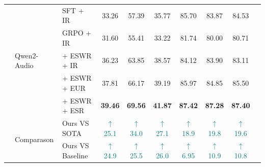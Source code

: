 \documentclass[11pt]{article}
\begin{document}
\begin{table}[ht]
\begin{tabularx}{\textwidth}{>{\raggedright\arraybackslash}p{1.55cm} llccccccc}
		\multirow{5}{*}{LALM-FT}
		                                     & \multirow{5}{*}{Qwen2-Audio~\cite{chu2024qwen2}}
		                                     & SFT + IR                                          & 33.26                            & 57.39                             & 35.77                                & 85.70                            & 83.87                            & 84.53                                                               \\
		                                     &                                                   & GRPO + IR                        & 31.60                             & 55.41                                & 33.22                            & 81.74                            & 80.00                            & 80.71                            \\
		                                     &                                                   & + ESWR + IR                      & 36.23                             & 63.85                                & 38.57                            & 84.12                            & 83.90                            & 83.11                            \\
		                                     &                                                   & + ESWR + EUR                     & 37.81                             & 66.17                                & 39.19                            & 85.97                            & 84.85                            & 85.50                            \\
		                                     &                                                   & + ESWR + ESR                     & \textbf{39.46}                    & \textbf{69.56}                       & \textbf{41.87}                   & \textbf{87.42}                   & \textbf{87.28}                   & \textbf{87.40}                   \\
		\midrule
		\multirow{2}{2}{/}                   & \multirow{2}{*}{Comparason}
		                                     & Ours VS SOTA                                      & \textcolor{teal}{$\uparrow$25.1} & \textcolor{teal}{$\uparrow$34.0}  & \textcolor{teal}{$\uparrow$27.1}     & \textcolor{teal}{$\uparrow$18.9} & \textcolor{teal}{$\uparrow$19.8} & \textcolor{teal}{$\uparrow$19.6}                                    \\
		                                     &                                                   & Ours VS Baseline                 & \textcolor{teal}{$\uparrow$24.9}  & \textcolor{teal}{$\uparrow$25.5}     & \textcolor{teal}{$\uparrow$26.0} & \textcolor{teal}{$\uparrow$6.95} & \textcolor{teal}{$\uparrow$10.9} & \textcolor{teal}{$\uparrow$10.8} \\

		\bottomrule
	\end{tabularx}
\end{table}
\end{document}

